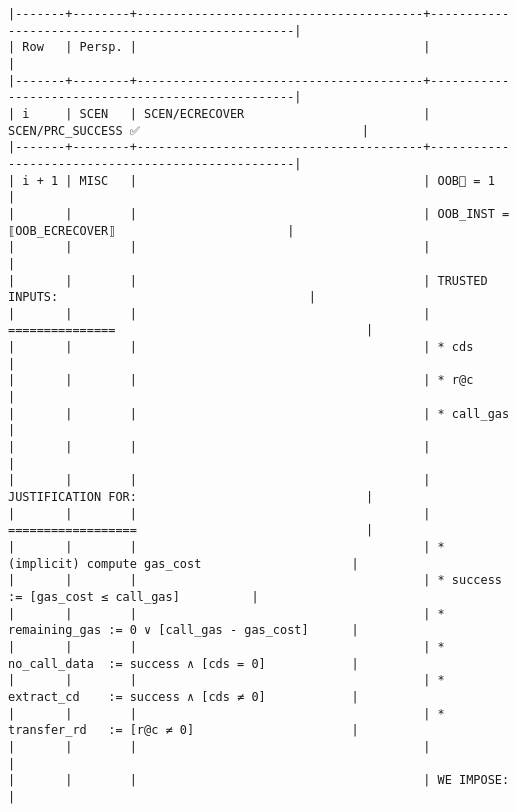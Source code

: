 \documentclass[varwidth=\maxdimen,margin=0.5cm,multi={verbatim}]{standalone}
\begin{document}
\begin{verbatim}
|-------+--------+----------------------------------------+---------------------------------------------------|
| Row   | Persp. |                                        |                                                   |
|-------+--------+----------------------------------------+---------------------------------------------------|
| i     | SCEN   | SCEN/ECRECOVER                         | SCEN/PRC_SUCCESS ✅                               |
|-------+--------+----------------------------------------+---------------------------------------------------|
| i + 1 | MISC   |                                        | OOB🏴 = 1                                         |
|       |        |                                        | OOB_INST = ⟦OOB_ECRECOVER⟧                        |
|       |        |                                        |                                                   |
|       |        |                                        | TRUSTED INPUTS:                                   |
|       |        |                                        | ===============                                   |
|       |        |                                        | * cds                                             |
|       |        |                                        | * r@c                                             |
|       |        |                                        | * call_gas                                        |
|       |        |                                        |                                                   |
|       |        |                                        | JUSTIFICATION FOR:                                |
|       |        |                                        | ==================                                |
|       |        |                                        | * (implicit) compute gas_cost                     |
|       |        |                                        | * success       := [gas_cost ≤ call_gas]          |
|       |        |                                        | * remaining_gas := 0 ∨ [call_gas - gas_cost]      |
|       |        |                                        | * no_call_data  := success ∧ [cds = 0]            |
|       |        |                                        | * extract_cd    := success ∧ [cds ≠ 0]            |
|       |        |                                        | * transfer_rd   := [r@c ≠ 0]                      |
|       |        |                                        |                                                   |
|       |        |                                        | WE IMPOSE:                                        |

\end{verbatim}
\end{document}
